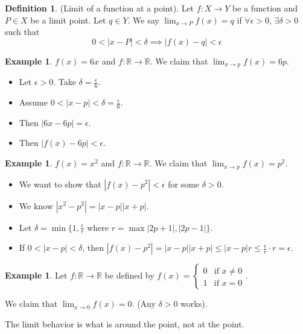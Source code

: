 \documentclass[10pt]{article}
\newcommand{\R}{\mathbb{R}}
\theoremstyle{definition}
\newtheorem{definition}[theorem]{Definition}
\newtheorem{example}[theorem]{Example}
\theoremstyle{remark}
\begin{document}
\begin{definition}
    (Limit of a function at a point).
    Let $f : X \to Y$ be a function and $P \in X$ be a limit point. Let $q \in Y$.
    We say $\lim_{x \to P} f(x) = q$ if $\forall \epsilon > 0$, $\exists \delta > 0$ such that
    $$0 < |x - P| < \delta \implies |f(x) - q| < \epsilon$$
\end{definition}

\begin{example}
    $f(x) = 6x$ and $f : \R \to \R$. We claim that $\lim_{x \to p} f(x) = 6p$.
    \begin{itemize}
        \item Let $\epsilon > 0$. Take $\delta = \frac{\epsilon}{6}$.
        \item Assume $0 < |x - p| < \delta = \frac{\epsilon}{6}$.
        \item Then $|6x - 6p| = \epsilon$.
        \item Then $|f(x) - 6p| < \epsilon$.
    \end{itemize}
\end{example}

\begin{example}
    $f(x) = x^2$ and $f : \R \to \R$. We claim that $\lim_{x \to p} f(x) = p^2$.
    \begin{itemize}
        \item We want to show that $|f(x) - p^2| < \epsilon$ for some $\delta > 0$.
        \item We know $|x^2 - p^2| = |x - p| |x + p|$.
        \item Let $\delta = \min\{1, \frac{\epsilon}{r}$ where $r = \max{|2p + 1|, |2p - 1|}\}$.
        \item If $ 0 < |x - p| < \delta$, then $|f(x) - p^2| = |x - p| |x + p| \leq |x - p| r \leq \frac{\epsilon}{r} \cdot r = \epsilon$.
    \end{itemize}
\end{example}

\begin{example}
    Let $f : \R \to \R$ be defined by $f(x) = \begin{cases} 0 & \text{if } x \neq 0 \\ 1 & \text{if } x = 0 \end{cases}$.

    We claim that $\lim_{x \to 0} f(x) = 0$. (Any $\delta > 0$ works).

    The limit behavior is what is around the point, not at the point.
\end{example}
\end{document}
